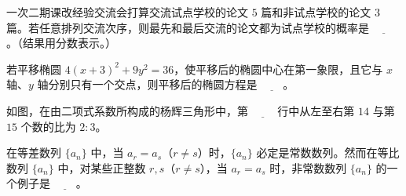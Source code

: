 \begin{question}
一次二期课改经验交流会打算交流试点学校的论文 $5$ 篇和非试点学校的论文 $3$ 篇。若任意排列交流次序，则最先和最后交流的论文都为试点学校的概率是 $\underline{\qquad}$。（结果用分数表示。）

\end{question}
\begin{question}
若平移椭圆 $4(x+3)^2+9y^2=36$，使平移后的椭圆中心在第一象限，且它与 $x$ 轴、$y$ 轴分别只有一个交点，则平移后的椭圆方程是 $\underline{\qquad}$。

\Needspace{0.4\textheight}
\end{question}
\begin{question}
如图，在由二项式系数所构成的杨辉三角形中，第 $\underline{\qquad}$ 行中从左至右第 $14$ 与第 $15$ 个数的比为 $2:3$。
\nopagebreak[4]
\begin{center}\end{center}
\nopagebreak[4]
\end{question}
\begin{question}
在等差数列 $\{a_n\}$ 中，当 $a_r=a_s$（$r\ne s$）时，$\{a_n\}$ 必定是常数数列。然而在等比数列 $\{a_n\}$ 中，对某些正整数 $r,s$（$r\ne s$），当 $a_r=a_s$ 时，非常数数列 $\{a_n\}$ 的一个例子是 $\underline{\qquad}$。

\end{question}

